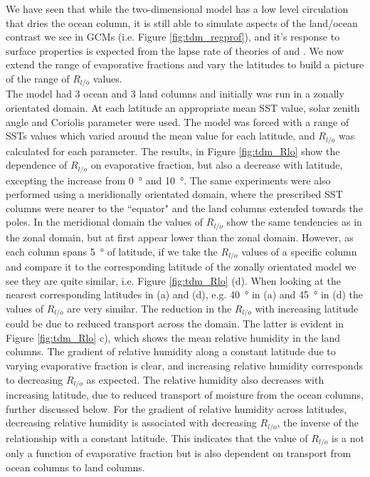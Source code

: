 We have seen that while the two-dimensional model has a low level circulation 
that dries the ocean column, it is still able to simulate aspects of the 
land/ocean contrast we see in GCMs (i.e. Figure \ref{fig:tdm_regprof}), and it's 
response to surface properties is expected from the lapse rate of theories of 
\cite{Joshi2007} and \cite{Byrne2013a}. We now extend the range of evaporative 
fractions and vary the latitudes to build a picture of the range of $R_{l/o}$ 
values.\\
The model had 3 ocean and 3 land columns and initially was run in a zonally 
orientated domain. At each latitude an appropriate mean SST value, solar zenith 
angle and Coriolis parameter were used.  The model was forced with a range of 
SSTs values which varied around the mean value for each latitude, and $R_{l/o}$ 
was calculated for each parameter.	The results, in Figure \ref{fig:tdm_Rlo} 
show the dependence of $R_{l/o}$ on evaporative fraction, but also a decrease 
with latitude, excepting the increase from \SI{0}{\degree} and \SI{10}{\degree}.  
The same experiments were also performed using a meridionally orientated domain, 
where the prescribed SST columns were nearer to the ``equator" and the land 
columns extended towards the poles.  In the meridional domain the values of 
$R_{l/o}$ show the same tendencies as in the zonal domain, but at first appear 
lower than the zonal domain. However, as each column spans \SI{5}{\degree} of 
latitude, if we take the $R_{l/o}$ values of a specific column and compare it to 
the corresponding latitude of the zonally orientated model we see they are quite 
similar, i.e. Figure \ref{fig:tdm_Rlo} (d). When looking at the nearest 
corresponding latitudes in (a) and (d), e.g. \SI{40}{\degree} in (a) and 
\SI{45}{\degree} in (d) the values of $R_{l/o}$ are very similar.  The reduction 
in the $R_{l/o}$ with increasing latitude could be due to reduced transport 
across the domain. The latter is evident in Figure \ref{fig:tdm_Rlo} c), which 
shows the mean relative humidity in the land columns. The gradient of relative 
humidity along a constant latitude due to varying evaporative fraction is clear, 
and increasing relative humidity corresponds to decreasing $R_{l/o}$ as 
expected.  The relative humidity also decreases with increasing latitude, due to 
reduced transport of moisture from the ocean columns, further discussed below.  
For the gradient of relative humidity across latitudes, decreasing relative 
humidity is associated with decreasing $R_{l/o}$, the inverse of the 
relationship with a constant latitude.  This indicates that the value of 
$R_{l/o}$ is a not only a function of evaporative fraction but is also dependent 
on transport from ocean columns to land columns.\\

